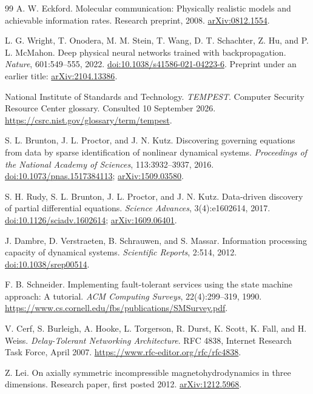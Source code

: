 \begin{thebibliography}{99}
A. W. Eckford. Molecular communication: Physically realistic models and achievable information rates. Research preprint, 2008. \href{https://arxiv.org/abs/0812.1554}{arXiv:0812.1554}.

L. G. Wright, T. Onodera, M. M. Stein, T. Wang, D. T. Schachter, Z. Hu, and P. L. McMahon. Deep physical neural networks trained with backpropagation. \emph{Nature}, 601:549--555, 2022. \href{https://doi.org/10.1038/s41586-021-04223-6}{doi:10.1038/s41586-021-04223-6}. Preprint under an earlier title: \href{https://arxiv.org/abs/2104.13386}{arXiv:2104.13386}.

National Institute of Standards and Technology. \emph{TEMPEST}. Computer Security Resource Center glossary. Consulted 10 September 2026. \url{https://csrc.nist.gov/glossary/term/tempest}.

S. L. Brunton, J. L. Proctor, and J. N. Kutz. Discovering governing equations from data by sparse identification of nonlinear dynamical systems. \emph{Proceedings of the National Academy of Sciences}, 113:3932--3937, 2016. \href{https://doi.org/10.1073/pnas.1517384113}{doi:10.1073/pnas.1517384113}; \href{https://arxiv.org/abs/1509.03580}{arXiv:1509.03580}.

S. H. Rudy, S. L. Brunton, J. L. Proctor, and J. N. Kutz. Data-driven discovery of partial differential equations. \emph{Science Advances}, 3(4):e1602614, 2017. \href{https://doi.org/10.1126/sciadv.1602614}{doi:10.1126/sciadv.1602614}; \href{https://arxiv.org/abs/1609.06401}{arXiv:1609.06401}.

J. Dambre, D. Verstraeten, B. Schrauwen, and S. Massar. Information processing capacity of dynamical systems. \emph{Scientific Reports}, 2:514, 2012. \href{https://doi.org/10.1038/srep00514}{doi:10.1038/srep00514}.

F. B. Schneider. Implementing fault-tolerant services using the state machine approach: A tutorial. \emph{ACM Computing Surveys}, 22(4):299--319, 1990. \url{https://www.cs.cornell.edu/fbs/publications/SMSurvey.pdf}.

V. Cerf, S. Burleigh, A. Hooke, L. Torgerson, R. Durst, K. Scott, K. Fall, and H. Weiss. \emph{Delay-Tolerant Networking Architecture}. RFC 4838, Internet Research Task Force, April 2007. \url{https://www.rfc-editor.org/rfc/rfc4838}.

Z. Lei. On axially symmetric incompressible magnetohydrodynamics in three dimensions. Research paper, first posted 2012. \href{https://arxiv.org/abs/1212.5968}{arXiv:1212.5968}.


\end{thebibliography}
